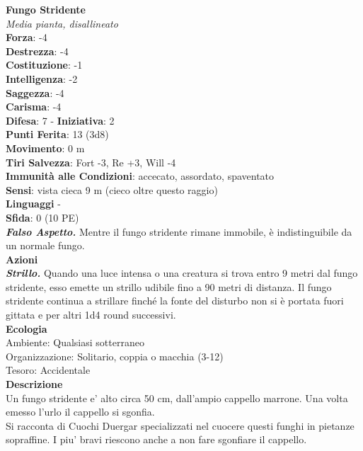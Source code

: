 \begin{multicols}{2}
\medskip\textbf{Fungo Stridente}\\
\emph{Media pianta, disallineato}\\
\textbf{Forza}: -4\\
\textbf{Destrezza}: -4\\
\textbf{Costituzione}: -1\\
\textbf{Intelligenza}: -2\\
\textbf{Saggezza}: -4\\
\textbf{Carisma}: -4\\
\textbf{Difesa}: 7 - \textbf{Iniziativa}: 2\\
\textbf{Punti Ferita}: 13 (3d8)\\
\textbf{Movimento}: 0 m\\
\textbf{Tiri Salvezza}: Fort -3, Re +3, Will -4\\
\textbf{Immunità alle Condizioni}: accecato, assordato, spaventato\\
\textbf{Sensi}: vista cieca 9 m (cieco oltre questo raggio)\\
\textbf{Linguaggi} -\\
\textbf{Sfida}: 0 (10 PE)\smallskip\\
\emph{\textbf{Falso Aspetto.}} Mentre il fungo stridente rimane immobile, è indistinguibile da un normale fungo.\\
\smallskip\textbf{Azioni}\\
\emph{\textbf{Strillo.}} Quando una luce intensa o una creatura si trova entro 9 metri dal fungo stridente, esso emette un strillo udibile fino a 90 metri di distanza. Il fungo stridente continua a strillare finché la fonte del disturbo non si è portata fuori gittata e per altri 1d4 round successivi.\\
\textbf{Ecologia}\\
Ambiente: Qualsiasi sotterraneo\\
Organizzazione: Solitario, coppia o macchia (3-12)\\
Tesoro: Accidentale\\
\textbf{Descrizione}\\
Un fungo stridente e' alto circa 50 cm, dall'ampio cappello marrone. Una volta emesso l'urlo il cappello si sgonfia. \\
Si racconta di Cuochi Duergar specializzati nel cuocere questi funghi in pietanze sopraffine.
I piu' bravi riescono anche a non fare sgonfiare il cappello.\\


\end{multicols}
